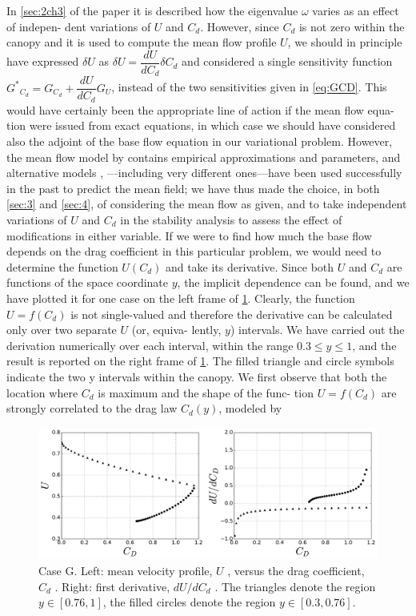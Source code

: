 In \ref{sec:2ch3} of the paper it is described how the eigenvalue $\omega$ varies as an effect of indepen-
dent variations of $U$ and $C_d$. However, since $C_d$ is not zero within the canopy and it is used to
compute the mean flow profile $U$, we should in principle have expressed $\delta U$ as $\delta U = \dfrac{dU}{d C_d} \delta C_d$
and considered a single sensitivity function ${G^*}_{C_d} = G_{C_d} + \dfrac{dU}{d C_d} G_U$, instead of the two sensitivities given
in \ref{eq:GCD}. This would have certainly been the appropriate line of action if the mean flow equa-
tion were issued from exact equations, in which case we should have considered also the adjoint
of the base flow equation in our variational problem. However, the mean flow model by \citet{ghisalberti2004limited} contains empirical approximations and parameters, and alternative models \citet{singh2016linear}, \citet{zampogna2016instability} —including
very different ones—have been used successfully in the past to predict the mean field; we have thus
made the choice, in both \ref{sec:3} and \ref{sec:4}, of considering the mean flow as given, and to take
independent variations of $U$ and $C_d$ in the stability analysis to assess the effect of modifications in
either variable.
If we were to find how much the base flow depends on the drag coefficient in this particular
problem, we would need to determine the function $U(C_d)$ and take its derivative. Since both $U$
and  $C_d$ are functions of the space coordinate $y$, the implicit dependence can be found, and we
have plotted it for one case on the left frame of \ref{fig:9}. Clearly, the function $U = f(C_d)$ is not
single-valued and therefore the derivative can be calculated only over two separate $U$ (or, equiva-
lently, $y$) intervals. We have carried out the derivation numerically over each interval, within the
range $0.3 \leq y \leq 1$, and the result is reported on the right frame of \ref{fig:9}. The filled triangle and
circle symbols indicate the two y intervals within the canopy.
We first observe that both the location where $C_d$ is maximum and the shape of the func-
tion $U = f(C_d)$ are strongly correlated to the drag law $C_d(y)$, modeled by \citet{ghisalberti2004limited}


\begin{figure}[H]
	\centering
	\includegraphics[width=1\linewidth]{chapter_3/figure/9}
	\caption{Case G. Left: mean velocity profile, $U$ , versus the drag coefficient, $C_d$ . Right: first derivative, $dU / d C_d$ . The triangles denote the region $y \in [0.76, 1]$, the filled circles denote the region $y \in [0.3, 0.76]$.}
	\label{fig:9}
\end{figure}

